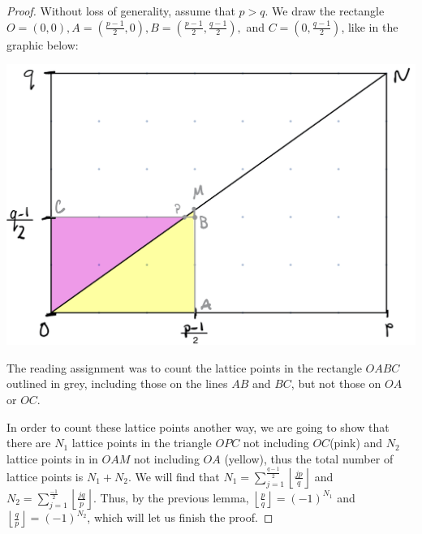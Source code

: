 \documentclass[letterpaper, 11 pt]{article}
\begin{document}
%
%
\begin{proof}
 Without loss of generality, assume that $p>q$. We draw the rectangle $O=(0,0), A=\left(\frac{p-1}{2},0\right), B=\left(\frac{p-1}{2},\frac{q-1}{2}\right),$ and $C=\left(0,\frac{q-1}{2}\right)$, like in the graphic below:

\includegraphics[width=\textwidth]{lattice}

The reading assignment was to count the lattice points in the rectangle $OABC$ outlined in grey, including those on the lines $AB$ and $BC$, but not those on $OA$ or $OC$. 

In order to count these lattice points another way, we are going to show that there are $N_1$ lattice points in the triangle $OPC$ not including $OC$(pink)  and $N_2$ lattice points in in $OAM$ not including $OA$ (yellow), thus the total number of lattice points is $N_1+N_2$. We will find that $N_1=\sum_{j=1}^{\frac{q-1}{2}}\left\lfloor\frac{jp}{q}\right\rfloor$ and $N_2=\sum_{j=1}^{\frac{-1}{2}}\left\lfloor\frac{jq}{p}\right\rfloor$. Thus, by the previous lemma, $\left\lfloor\frac{p}{q}\right\rfloor=(-1)^{N_1}$ and $\left\lfloor\frac{q}{p}\right\rfloor=(-1)^{N_2}$, which will let us finish the proof. 


\end{proof}
\end{document}
